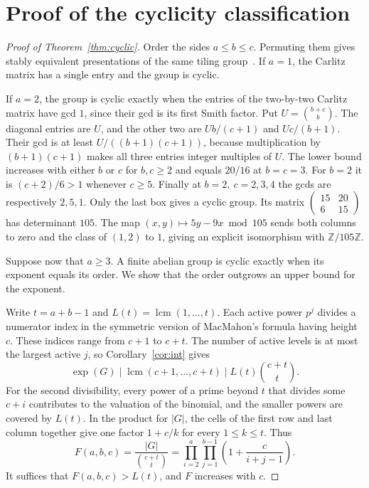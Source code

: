 \documentclass[11pt]{article}
\newcommand{\Z}{\mathbb Z}
\begin{document}
\section{Proof of the cyclicity classification}\label{sec:cyclic-proof}

\begin{proof}[Proof of Theorem~\ref{thm:cyclic}]
Order the sides \(a\le b\le c\). Permuting them gives stably equivalent
presentations of the same tiling group~\cite[Problem~5]{Propp}.
If \(a=1\), the Carlitz matrix has a single entry and the group is cyclic.

If \(a=2\), the group is cyclic exactly when the entries of the
two-by-two Carlitz matrix have gcd \(1\), since their gcd is its first
Smith factor. Put \(U=\binom{b+c}{b}\). The diagonal entries are \(U\),
and the other two are \(Ub/(c+1)\) and \(Uc/(b+1)\). Their gcd is at least
\(U/((b+1)(c+1))\), because multiplication by \((b+1)(c+1)\) makes
all three entries integer multiples of \(U\). The lower bound increases
with either \(b\) or \(c\) for \(b,c\ge2\) and equals \(20/16\) at \(b=c=3\).
For \(b=2\) it is \((c+2)/6>1\) whenever \(c\ge5\).
Finally at \(b=2,\ c=2,3,4\) the gcds are respectively \(2,5,1\).
Only the last box gives a cyclic group. Its matrix
\(\left(\begin{smallmatrix}15&20\\6&15\end{smallmatrix}\right)\)
has determinant \(105\). The map \((x,y)\mapsto5y-9x\bmod105\)
sends both columns to zero and the class of \((1,2)\) to \(1\), giving
an explicit isomorphism with \(\Z/105\Z\).

Suppose now that \(a\ge3\). A finite abelian group is cyclic exactly
when its exponent equals its order. We show that the order outgrows an
upper bound for the exponent.

Write \(t=a+b-1\) and \(L(t)=\operatorname{lcm}(1,\ldots,t)\).
Each active power \(p^j\) divides a numerator index in the symmetric
version of MacMahon's formula having height \(c\). These indices range
from \(c+1\) to \(c+t\). The number of active levels is at most the
largest active \(j\), so Corollary~\ref{cor:int} gives
\[
 \exp(G)\mid\operatorname{lcm}(c+1,\ldots,c+t)
             \mid L(t)\binom{c+t}{t}.
\]
For the second divisibility, every power of a prime beyond \(t\) that
divides some \(c+i\) contributes to the valuation of the binomial,
and the smaller powers are covered by \(L(t)\).
In the product for \(|G|\), the cells of the first row and last column
together give one factor \(1+c/k\) for every \(1\le k\le t\). Thus
\[
 F(a,b,c)=\frac{|G|}{\binom{c+t}{t}}
       =\prod_{i=2}^{a}\prod_{j=1}^{b-1}\left(1+\frac{c}{i+j-1}\right).
\]
It suffices that \(F(a,b,c)>L(t)\), and \(F\) increases with \(c\).


\end{proof}
\end{document}
